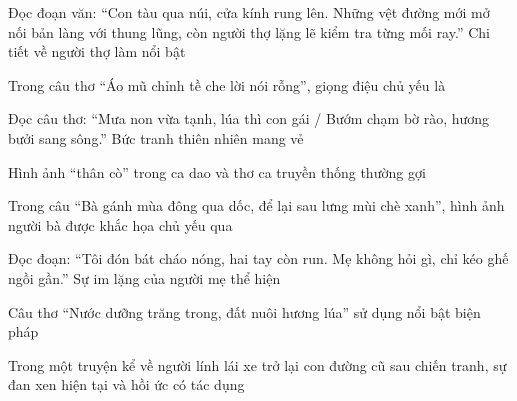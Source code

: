 \begin{ex}
Đọc đoạn văn: “Con tàu qua núi, cửa kính rung lên. Những vệt đường mới mở nối bản làng với thung lũng, còn người thợ lặng lẽ kiểm tra từng mối ray.” Chi tiết về người thợ làm nổi bật
\end{ex}

\begin{ex}
Trong câu thơ “Áo mũ chỉnh tề che lời nói rỗng”, giọng điệu chủ yếu là
\end{ex}

\begin{ex}
Đọc câu thơ: “Mưa non vừa tạnh, lúa thì con gái / Bướm chạm bờ rào, hương bưởi sang sông.” Bức tranh thiên nhiên mang vẻ
\end{ex}

\begin{ex}
Hình ảnh “thân cò” trong ca dao và thơ ca truyền thống thường gợi
\end{ex}

\begin{ex}
Trong câu “Bà gánh mùa đông qua dốc, để lại sau lưng mùi chè xanh”, hình ảnh người bà được khắc họa chủ yếu qua
\end{ex}

\begin{ex}
Đọc đoạn: “Tôi đón bát cháo nóng, hai tay còn run. Mẹ không hỏi gì, chỉ kéo ghế ngồi gần.” Sự im lặng của người mẹ thể hiện
\end{ex}

\begin{ex}
Câu thơ “Nước dưỡng trăng trong, đất nuôi hương lúa” sử dụng nổi bật biện pháp
\end{ex}

\begin{ex}
Trong một truyện kể về người lính lái xe trở lại con đường cũ sau chiến tranh, sự đan xen hiện tại và hồi ức có tác dụng
\end{ex}

